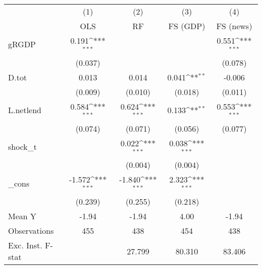 {
\def\sym#1{\ifmmode^{#1}\else\(^{#1}\)\fi}
\begin{tabular}{l*{4}{c}}
\toprule
            &\multicolumn{1}{c}{(1)}&\multicolumn{1}{c}{(2)}&\multicolumn{1}{c}{(3)}&\multicolumn{1}{c}{(4)}\\
            &\multicolumn{1}{c}{OLS}&\multicolumn{1}{c}{RF}&\multicolumn{1}{c}{FS (GDP)}&\multicolumn{1}{c}{FS (news)}\\
\midrule
gRGDP       &       0.191\sym{***}&                     &                     &       0.551\sym{***}\\
            &     (0.037)         &                     &                     &     (0.078)         \\
\addlinespace
D.tot       &       0.013         &       0.014         &       0.041\sym{**} &      -0.006         \\
            &     (0.009)         &     (0.010)         &     (0.018)         &     (0.011)         \\
\addlinespace
L.netlend   &       0.584\sym{***}&       0.624\sym{***}&       0.133\sym{**} &       0.553\sym{***}\\
            &     (0.074)         &     (0.071)         &     (0.056)         &     (0.077)         \\
\addlinespace
shock\_t     &                     &       0.022\sym{***}&       0.038\sym{***}&                     \\
            &                     &     (0.004)         &     (0.004)         &                     \\
\addlinespace
\_cons      &      -1.572\sym{***}&      -1.840\sym{***}&       2.323\sym{***}&                     \\
            &     (0.239)         &     (0.255)         &     (0.218)         &                     \\
\midrule
Mean Y      &       -1.94         &       -1.94         &        4.00         &       -1.94         \\
Observations&         455         &         438         &         454         &         438         \\
Exc. Inst. F-stat&                     &      27.799         &      80.310         &      83.406         \\
\bottomrule
\end{tabular}
}
